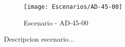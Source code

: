 \begin{figure}[H]
\centering
\texttt{[image: Escenarios/AD-45-00]}
\caption{Escenario - AD-45-00}
\label{fig:AD-45-00}
\end{figure}

Descripcion escenario...
\clearpage

